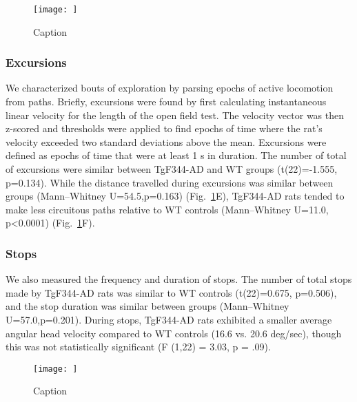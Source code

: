 \documentclass[fleqn,10pt]{wlscirep}
\begin{document}
\begin{figure}
    \centering
    \texttt{[image: ]}
    \caption{Caption}
    \label{locomotor_fig}
\end{figure}

\subsubsection*{Excursions}
We characterized bouts of exploration by parsing epochs of active locomotion from paths. Briefly, excursions were found by first calculating instantaneous linear velocity for the length of the open field test. The velocity vector was then z-scored and thresholds were applied to find epochs of time where the rat's velocity exceeded two standard deviations above the mean. Excursions were defined as epochs of time that were at least 1 s in duration. The number of total of excursions were similar between TgF344-AD and WT groups (t(22)=-1.555, p=0.134). While the distance travelled during excursions was similar between groups (Mann–Whitney U=54.5,p=0.163) (Fig.~\ref{locomotor_fig}E), TgF344-AD rats tended to make less circuitous paths relative to WT controls (Mann–Whitney U=11.0, p<0.0001) (Fig.~\ref{locomotor_fig}F). 

\subsubsection*{Stops} We also measured the frequency and duration of stops. The number of total stops made by TgF344-AD rats was similar to WT controls (t(22)=0.675, p=0.506), and the stop duration was similar between groups (Mann–Whitney U=57.0,p=0.201). During stops, TgF344-AD rats exhibited a smaller average angular head velocity compared to WT controls (16.6 vs. 20.6 deg/sec), though this was not statistically significant (F (1,22) = 3.03, p = .09). 

\begin{figure}
    \centering
    \texttt{[image: ]}
    \caption{Caption}
    \label{homebase_fig}
\end{figure}
\end{document}
